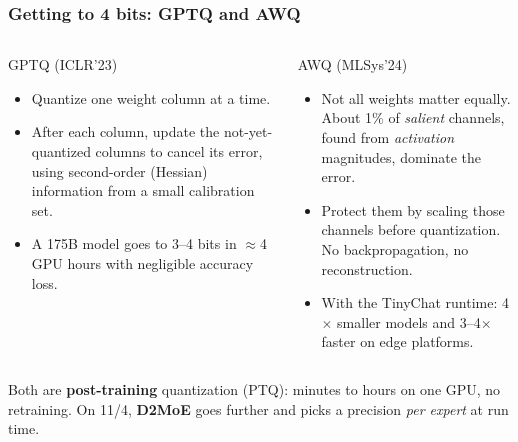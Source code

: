 \begin{frame}
\frametitle{Getting to 4 bits: GPTQ and AWQ}
\begin{columns}[T]
\begin{block}{GPTQ (ICLR'23)}
\small
\begin{itemize}
  \item Quantize one weight column at a time.
  \item After each column, update the not-yet-quantized columns to cancel its error, using second-order (Hessian) information from a small calibration set.
  \item A 175B model goes to 3--4 bits in $\approx$4 GPU hours with negligible accuracy loss.
\end{itemize}
\end{block}
\begin{block}{AWQ (MLSys'24)}
\small
\begin{itemize}
  \item Not all weights matter equally. About 1\% of \emph{salient} channels, found from \emph{activation} magnitudes, dominate the error.
  \item Protect them by scaling those channels before quantization. No backpropagation, no reconstruction.
  \item With the TinyChat runtime: 4$\times$ smaller models and 3--4$\times$ faster on edge platforms.
\end{itemize}
\end{block}
\end{columns}
\vspace{6pt}
\small
Both are \textbf{post-training} quantization (PTQ): minutes to hours on one GPU, no retraining. On 11/4, \textbf{D2MoE} goes further and picks a precision \emph{per expert} at run time.
\end{frame}

